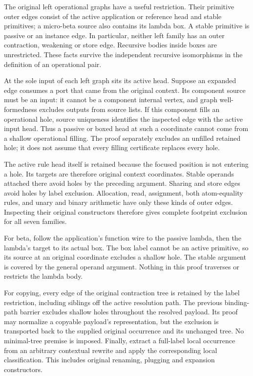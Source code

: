 The original left operational graphs have a useful restriction. Their
primitive outer edges consist of the active application or reference head
and stable primitives; a micro-beta source also contains its lambda box.
A stable primitive is passive or an instance edge. In particular, neither
left family has an outer contraction, weakening or store edge. Recursive
bodies inside boxes are unrestricted. These facts survive the independent
recursive isomorphisms in the definition of an operational pair.

At the sole input of each left graph sits its active head. Suppose an expanded
edge consumes a port that came from the original context. Its component
source must be an input: it cannot be a component internal vertex, and graph
well-formedness excludes outputs from source lists. If this component fills
an operational hole, source uniqueness identifies the inspected edge with
the active input head. Thus a passive or boxed head at such a coordinate
cannot come from a shallow operational filling. The proof separately excludes
an unfilled retained hole; it does not assume that every filling certificate
replaces every hole.

The active rule head itself is retained because the focused position is not
entering a hole. Its targets are therefore original context coordinates.
Stable operands attached there avoid holes by the preceding argument.
Sharing and store edges avoid holes by label exclusion. Allocation, read,
assignment, both atom-equality rules, and unary and binary arithmetic have
only these kinds of outer edges. Inspecting their original constructors
therefore gives complete footprint exclusion for all seven families.

For beta, follow the application's function wire to the passive lambda,
then the lambda's target to its actual box. The box label cannot be an active
primitive, so its source at an original coordinate excludes a shallow hole.
The stable argument is covered by the general operand argument. Nothing in
this proof traverses or restricts the lambda body.

For copying, every edge of the original contraction tree is retained by the
label restriction, including siblings off the active resolution path. The
previous binding-path barrier excludes shallow holes throughout the resolved
payload. Its proof may normalize a copyable payload's representation, but
the exclusion is transported back to the supplied original occurrence and
its unchanged tree. No minimal-tree premise is imposed. Finally, extract a
full-label local occurrence from an arbitrary contextual rewrite and apply
the corresponding local classification. This includes original renaming,
plugging and expansion constructors.

